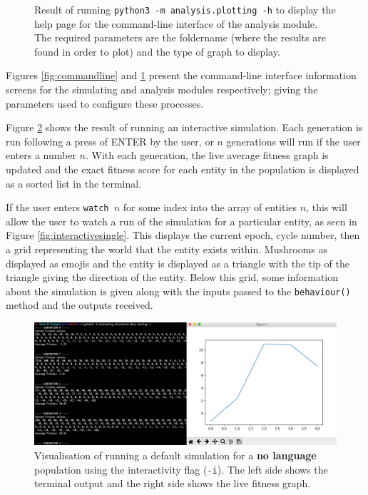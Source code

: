 \documentclass[12pt,a4paper,twoside,openright]{report}
\begin{document}
\begin{figure}[t]
\begin{minipage}{0.49\textwidth}
          \caption{Result of running \texttt{python3 -m analysis.plotting -h} to display the help page for the command-line interface of the analysis module. The required parameters are the foldername (where the results are found in order to plot) and the type of graph to display.}
      \label{fig:commandline2}
   \end{minipage}
\end{figure}

Figures \ref{fig:commandline} and \ref{fig:commandline2} present the command-line interface information screens for the simulating and analysis modules respectively; giving the parameters used to configure these processes.

Figure \ref{fig:interactive} shows the result of running an interactive simulation. Each generation is run following a press of ENTER by the user, or $n$ generations will run if the user enters a number $n$. With each generation, the live average fitness graph is updated and the exact fitness score for each entity in the population is displayed as a sorted list in the terminal.

If the user enters \texttt{watch $n$} for some index into the array of entities $n$, this will allow the user to watch a run of the simulation for a particular entity, as seen in Figure \ref{fig:interactivesingle}. This displays the current epoch, cycle number, then a grid representing the world that the entity exists within. Mushrooms as displayed as emojis and the entity is displayed as a triangle with the tip of the triangle giving the direction of the entity. Below this grid, some information about the simulation is given along with the inputs passed to the \texttt{behaviour()} method and the outputs received.

\begin{figure}[ht]
  \centering
  \includegraphics[width=.9\linewidth]{figs/interactive}
  \caption{Visualisation of running a default simulation for a {\bf no language} population using the interactivity flag (\texttt{-i}). The left side shows the terminal output and the right side shows the live fitness graph.}
  \label{fig:interactive}
\end{figure}
\end{document}
